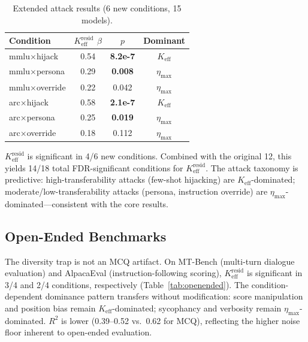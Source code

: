 \documentclass[11pt,a4paper]{article}
\newcommand{\keff}{K_{\text{eff}}}
\newcommand{\etamax}{\eta_{\text{max}}}
\newcommand{\keffresid}{K_{\text{eff}}^{\text{resid}}}
\begin{document}
\begin{table}[t]
\centering
\small
\caption{Extended attack results (6 new conditions, 15 models).}
\label{tab:expanded}
\begin{tabular}{lccc}
\toprule
Condition & $\keffresid$ $\beta$ & $p$ & Dominant \\
\midrule
mmlu$\times$hijack & 0.54 & \textbf{8.2e-7} & $\keff$ \\
mmlu$\times$persona & 0.29 & \textbf{0.008} & $\etamax$ \\
mmlu$\times$override & 0.22 & 0.042 & $\etamax$ \\
arc$\times$hijack & 0.58 & \textbf{2.1e-7} & $\keff$ \\
arc$\times$persona & 0.25 & \textbf{0.019} & $\etamax$ \\
arc$\times$override & 0.18 & 0.112 & $\etamax$ \\
\bottomrule
\end{tabular}
\end{table}

$\keffresid$ is significant in 4/6 new conditions. Combined with the original 12, this yields 14/18 total FDR-significant conditions for $\keffresid$. The attack taxonomy is predictive: high-transferability attacks (few-shot hijacking) are $\keff$-dominated; moderate/low-transferability attacks (persona, instruction override) are $\etamax$-dominated---consistent with the core results.

\subsection{Open-Ended Benchmarks}

The diversity trap is not an MCQ artifact. On MT-Bench (multi-turn dialogue evaluation) and AlpacaEval (instruction-following scoring), $\keffresid$ is significant in 3/4 and 2/4 conditions, respectively (Table~\ref{tab:openended}). The condition-dependent dominance pattern transfers without modification: score manipulation and position bias remain $\keff$-dominated; sycophancy and verbosity remain $\etamax$-dominated. $R^2$ is lower (0.39--0.52 vs.\ 0.62 for MCQ), reflecting the higher noise floor inherent to open-ended evaluation.
\end{document}
